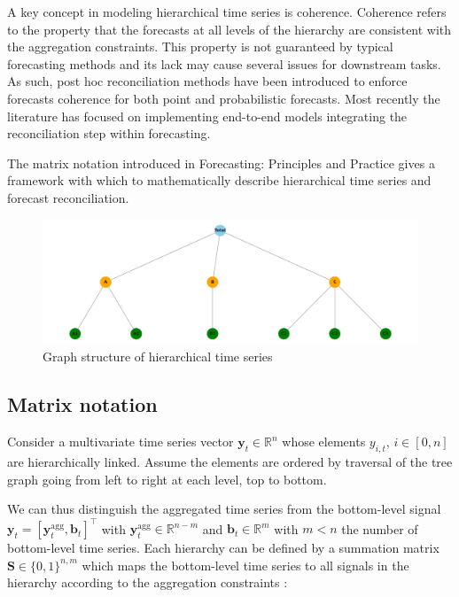 \documentclass[letterpaper]{article}
\begin{document}
A key concept in modeling hierarchical time series is coherence.
Coherence refers to the property that the forecasts at all levels of the hierarchy are consistent with the aggregation constraints. 
This property is not guaranteed by typical forecasting methods and its lack may cause several issues for downstream tasks. 
As such, post hoc reconciliation methods have been introduced to enforce forecasts coherence for both point and probabilistic forecasts. 
Most recently the literature has focused on implementing end-to-end models integrating the reconciliation step within forecasting.

The matrix notation introduced in Forecasting: Principles and Practice \cite{bookhyndman} gives a framework with which to mathematically describe hierarchical time series and forecast reconciliation.

\begin{figure}
    \centering
    \includegraphics[width=\linewidth]{graph_nodes.png}
    \caption{Graph structure of hierarchical time series}
    \label{fig:hierarchy}
\end{figure}

\subsection{Matrix notation} \label{sec:matrix}

Consider a multivariate time series vector $ \mathbf{y}_t \in \mathbb{R}^n $ whose elements $y_{i,t}$,  $ i\in[0,n]$ are hierarchically linked. 
Assume the elements are ordered by traversal of the tree graph going from left to right at each level, top to bottom. 

We can thus distinguish the aggregated time series from the bottom-level signal $\mathbf{y}_t = [\mathbf{y}^{\mathrm{agg}}_t,\mathbf{b}_t]^{\top} $ with $\mathbf{y}^{\mathrm{agg}}_t \in \mathbb{R}^{n-m}$ and $\mathbf{b}_t \in \mathbb{R}^{m}$ with $m < n$ the number of bottom-level time series.
Each hierarchy can be defined by a summation matrix $\mathbf{S} \in \{0,1\}^{n,m}$ which maps the bottom-level time series to all signals in the hierarchy according to the aggregation constraints :
\end{document}
